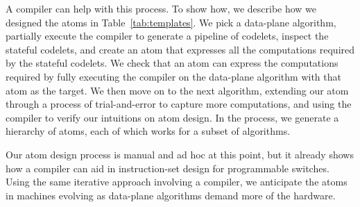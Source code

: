  A compiler can help with this process. To show how, we describe how we
designed the atoms in Table~\ref{tab:templates}. We pick a data-plane
algorithm, partially execute the \pktlanguage compiler to generate a pipeline
of codelets, inspect the stateful codelets, and create an atom that expresses
all the computations required by the stateful codelets. We check that an atom
can express the computations required by fully executing the compiler on the
data-plane algorithm with that atom as the target. We then move on to the next
algorithm, extending our atom through a process of trial-and-error to capture
more computations, and using the compiler to verify our intuitions on atom
design. In the process,  we generate a hierarchy of atoms, each of which works
for a subset of algorithms.

Our atom design process is manual and ad hoc at this point, but it already
shows how  a compiler can aid in instruction-set design for programmable
switches. Using the same iterative approach involving a compiler, we anticipate
the atoms in \absmachine machines evolving as data-plane algorithms demand more
of the hardware.

%
